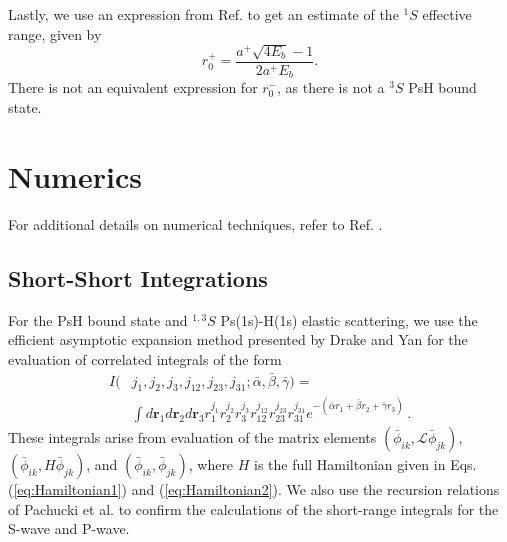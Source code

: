 \documentclass[preprint,showpacs,showkeys,preprintnumbers,amsmath,amssymb,longbibliography,pra,aps]{revtex4-1}
\begin{document}
Lastly, we use an expression from Ref. \cite{Blackwood2002} to get an estimate
of the $^1S$ effective range, given by
\begin{equation}
\label{eq:BlackwoodERT}
r_0^+ = \frac{a^+ \sqrt{4 E_b} - 1}{2 a^+ E_b}.
\end{equation}
There is not an equivalent expression for $r_0^-$, as there is not a $^3S$
PsH bound state.


\section{Numerics}
\label{sec:Numerical}

For additional details on numerical techniques, refer to Ref. \cite{WoodsDiss2015}.

\subsection{Short-Short Integrations}
\label{sec:ShortInt}
For the PsH bound state and $^{1,3}S$ Ps(1s)-H(1s) elastic scattering, we use
the efficient asymptotic expansion method presented by Drake and Yan
\cite{Drake1995} for the evaluation of correlated integrals of the form
\begin{align}
\label{eq:ShortInt}
I(&j_1,j_2,j_3,j_{12},j_{23},j_{31}; \bar{\alpha}, \bar{\beta}, \bar{\gamma}) =
  \nonumber \\
&\int
d \textbf{r}_1 d \textbf{r}_2 d \textbf{r}_3
r_1^{j_1} r_2^{j_2} r_3^{j_3} r_{12}^{j_{12}}
r_{23}^{j_{23}} r_{31}^{j_{31}}
e^{-(\bar{\alpha} r_1 + \bar{\beta} r_2 + \bar{\gamma} r_3)}\, .
\end{align}
These integrals arise from evaluation of the matrix elements
$(\bar{\phi}_{ik}, \mathcal{L} \bar{\phi}_{jk})$,
$(\bar{\phi}_{ik}, H \bar{\phi}_{jk})$,
and $(\bar{\phi}_{ik}, \bar{\phi}_{jk})$, where $H$
is the full Hamiltonian given in Eqs. (\ref{eq:Hamiltonian1}) and
(\ref{eq:Hamiltonian2}). We also use the recursion relations of Pachucki
et al. \cite{Pachucki2004} to confirm the calculations of the short-range 
integrals for the S-wave and P-wave.
\end{document}
